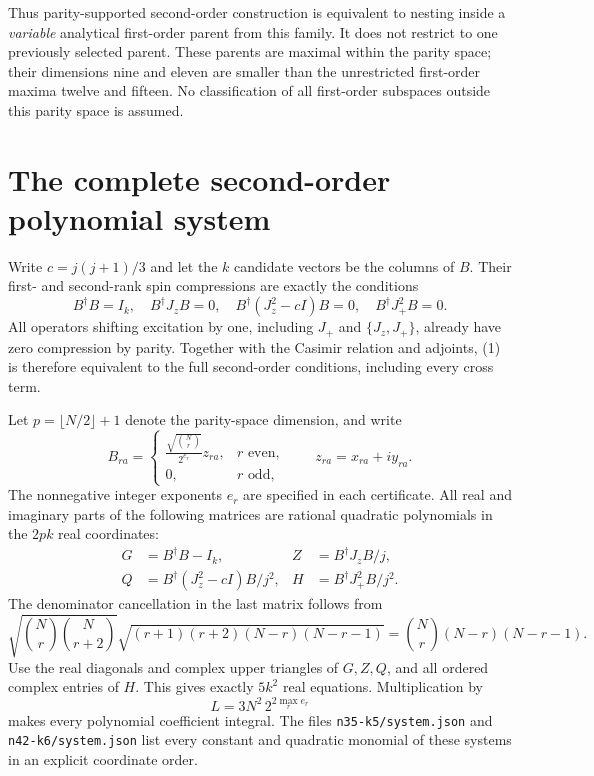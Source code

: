 \documentclass[11pt]{article}
\begin{document}
Thus parity-supported second-order construction is equivalent to nesting
inside a \emph{variable} analytical first-order parent from this family.
It does not restrict to one previously selected parent. These parents are
maximal within the parity space; their dimensions nine and eleven are
smaller than the unrestricted first-order maxima twelve and fifteen.
No classification of all first-order subspaces outside this parity space
is assumed.

\section{The complete second-order polynomial system}
Write $c=j(j+1)/3$ and let the $k$ candidate vectors be the columns of $B$.
Their first- and second-rank spin compressions are exactly the conditions
\[
 B^\dagger B=I_k,\quad B^\dagger J_zB=0,\quad
 B^\dagger(J_z^2-cI)B=0,\quad B^\dagger J_+^2B=0.
 \tag{1}
\]
All operators shifting excitation by one, including $J_+$ and
$\{J_z,J_+\}$, already have zero compression by parity. Together with
the Casimir relation and adjoints, (1) is therefore equivalent to the
full second-order conditions, including every cross term.

Let $p=\lfloor N/2\rfloor+1$ denote the parity-space dimension, and write
\[
 B_{ra}=\begin{cases}
 \displaystyle\frac{\sqrt{\binom Nr}}{2^{e_r}}z_{ra},&r\text{ even},\\
 0,&r\text{ odd},
 \end{cases}
 \qquad z_{ra}=x_{ra}+iy_{ra}.
 \tag{2}
\]
The nonnegative integer exponents $e_r$ are specified in each certificate.
All real and imaginary parts of the following matrices are rational
quadratic polynomials in the $2pk$ real coordinates:
\[
 \begin{aligned}
 G&=B^\dagger B-I_k,&
 Z&=B^\dagger J_zB/j,\\
 Q&=B^\dagger(J_z^2-cI)B/j^2,&
 H&=B^\dagger J_+^2B/j^2.
 \end{aligned}
\]
The denominator cancellation in the last matrix follows from
\[
 \sqrt{\binom Nr\binom N{r+2}}
 \sqrt{(r+1)(r+2)(N-r)(N-r-1)}
 =\binom Nr(N-r)(N-r-1).
\]
Use the real diagonals and complex upper triangles of $G,Z,Q$, and all
ordered complex entries of $H$. This gives exactly $5k^2$ real equations.
Multiplication by
\[
 L=3N^2\,2^{2\max_r e_r}
\]
makes every polynomial coefficient integral. The files
\texttt{n35-k5/system.json} and \texttt{n42-k6/system.json} list every
constant and quadratic monomial of these systems in an explicit coordinate
order.
\end{document}
